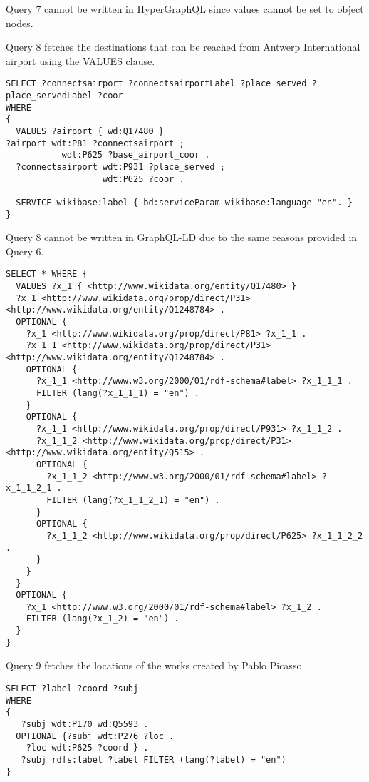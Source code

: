 Query 7 cannot be written in HyperGraphQL since values cannot be set to object nodes.

Query 8 fetches the destinations that can be reached from Antwerp International airport using the VALUES clause.

\begin{minipage}{\linewidth}
\begin{lstlisting}[label=listing:listing49, caption={Query 8}]
SELECT ?connectsairport ?connectsairportLabel ?place_served ?place_servedLabel ?coor
WHERE
{
  VALUES ?airport { wd:Q17480 }  
?airport wdt:P81 ?connectsairport ;
           wdt:P625 ?base_airport_coor .
  ?connectsairport wdt:P931 ?place_served ;
                   wdt:P625 ?coor .

  SERVICE wikibase:label { bd:serviceParam wikibase:language "en". }
}
\end{lstlisting}
\end{minipage}

Query 8 cannot be written in GraphQL-LD due to the same reasons provided in Query 6.

\begin{minipage}{\linewidth}
\begin{lstlisting}[label=listing:listing50, caption={Query 8 - HypergraphQL}]
SELECT * WHERE {
  VALUES ?x_1 { <http://www.wikidata.org/entity/Q17480> }
  ?x_1 <http://www.wikidata.org/prop/direct/P31> <http://www.wikidata.org/entity/Q1248784> .
  OPTIONAL {
    ?x_1 <http://www.wikidata.org/prop/direct/P81> ?x_1_1 .
    ?x_1_1 <http://www.wikidata.org/prop/direct/P31> <http://www.wikidata.org/entity/Q1248784> .
    OPTIONAL {
      ?x_1_1 <http://www.w3.org/2000/01/rdf-schema#label> ?x_1_1_1 .
      FILTER (lang(?x_1_1_1) = "en") .
    }
    OPTIONAL {
      ?x_1_1 <http://www.wikidata.org/prop/direct/P931> ?x_1_1_2 .
      ?x_1_1_2 <http://www.wikidata.org/prop/direct/P31> <http://www.wikidata.org/entity/Q515> .
      OPTIONAL {
        ?x_1_1_2 <http://www.w3.org/2000/01/rdf-schema#label> ?x_1_1_2_1 .
        FILTER (lang(?x_1_1_2_1) = "en") .
      }
      OPTIONAL {
        ?x_1_1_2 <http://www.wikidata.org/prop/direct/P625> ?x_1_1_2_2 .
      }
    }
  }
  OPTIONAL {
    ?x_1 <http://www.w3.org/2000/01/rdf-schema#label> ?x_1_2 .
    FILTER (lang(?x_1_2) = "en") .
  }
}
\end{lstlisting}
\end{minipage}

Query 9 fetches the locations of the works created by Pablo Picasso.

\begin{minipage}{\linewidth}
\begin{lstlisting}[label=listing:listing51, caption={Query 9}]
SELECT ?label ?coord ?subj
WHERE
{
   ?subj wdt:P170 wd:Q5593 .
  OPTIONAL {?subj wdt:P276 ?loc .
    ?loc wdt:P625 ?coord } .
   ?subj rdfs:label ?label FILTER (lang(?label) = "en")
}
\end{lstlisting}
\end{minipage}

